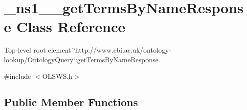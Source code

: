 \hypertarget{class__ns1____getTermsByNameResponse}{
\section{\_\-ns1\_\-\_\-getTermsByNameResponse Class Reference}
\label{class__ns1____getTermsByNameResponse}
}


Top-\/level root element \char`\"{}http://www.ebi.ac.uk/ontology-\/lookup/OntologyQuery\char`\"{}:getTermsByNameResponse.  




{\ttfamily \#include $<$OLSWS.h$>$}

\subsection*{Public Member Functions}
